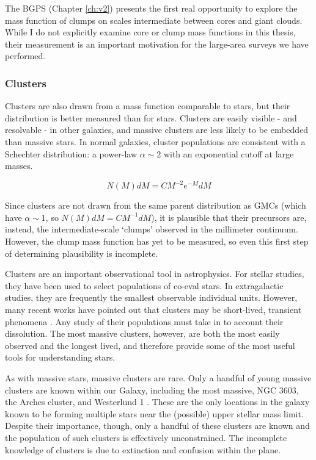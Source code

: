 The BGPS (Chapter \ref{ch:v2}) presents the first real opportunity to explore
the mass function of clumps on scales intermediate between cores and giant
clouds.   While I do not explicitly examine core or clump mass functions in this
thesis, their measurement is an important motivation for the large-area surveys
we have performed.

\subsubsection{Clusters}
Clusters are also drawn from a mass function comparable to stars, but
their distribution is better measured than for stars.  Clusters are
easily visible - and resolvable - in other galaxies, and massive clusters are
less likely to be embedded than massive stars.  In normal galaxies, cluster
populations are consistent with a Schechter distribution: a power-law
$\alpha\sim2$ with an exponential cutoff at large masses.

$$N(M)dM = C M^{-2} e^{-M} dM$$

Since clusters are not drawn from the same parent distribution as GMCs (which
have $\alpha\sim1$, so $N(M) dM = C M^{-1} dM$), it is plausible that their
precursors are, instead, the intermediate-scale `clumps' observed in the
millimeter continuum.  However, the clump mass function has yet to be measured,
so even this first step of determining plausibility is incomplete.

Clusters are an important observational tool in astrophysics.  For stellar
studies, they have been used to select populations of co-eval stars.  In
extragalactic studies, they are frequently the smallest observable individual
units.  However, many recent works have pointed out that clusters may be
short-lived, transient phenomena
\citep{Kruijssen2011a,Whitehead2013a,Gieles2011a,Whitmore2009a}.  Any study of
their populations must take in to account their dissolution.  The most massive
clusters, however, are both the most easily observed and the longest lived, and
therefore provide some of the most useful tools for understanding stars.

As with massive stars, massive clusters are rare.  Only a handful of young
massive clusters are known within our Galaxy, including the most massive,  NGC
3603, the Arches cluster, and Westerlund 1 \citep{PortegiesZwart2010}.  These
are the only locations in the galaxy known to be forming multiple stars near
the (possible) upper stellar mass limit.  Despite their importance, though,
only a handful of these clusters are known and the population of such clusters
is effectively unconstrained.  The incomplete knowledge of clusters is due to
extinction and confusion within the plane.


